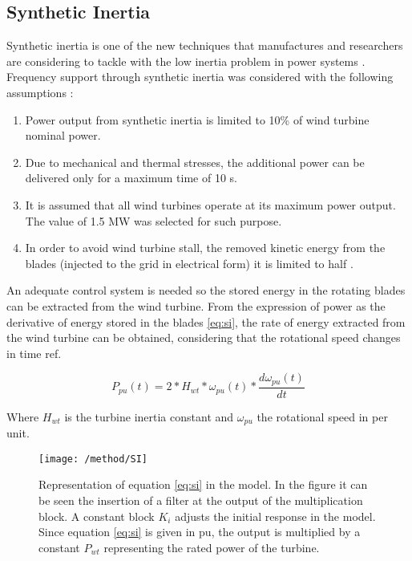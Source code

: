 \subsection{Synthetic Inertia}


Synthetic inertia is one of the new techniques that manufactures and researchers are considering to tackle with the low inertia problem in power systems \cite{Gevorgian.2017}\cite{GeneralElectricInternational.2013}. Frequency support through synthetic inertia was considered with the following assumptions \cite{dreidy2017inertia}\cite{nesje2015need}:
\begin{enumerate}[leftmargin=*,labelsep=4.9mm]
	\item Power output from synthetic inertia is limited to 10\% of wind turbine nominal power.
	\item Due to mechanical and thermal stresses, the additional power can be delivered only for a maximum time of 10 s.
	\item It is assumed that all wind turbines operate at its maximum power output. The value of 1.5 MW was selected for such purpose.
	\item In order to avoid wind turbine stall, the removed kinetic energy from the blades (injected to the grid in electrical form) it is limited to half \cite{E.MuljadiV.GevorgianandM.Singh:NREL.2012}.

\end{enumerate}

	An adequate control system is needed so the stored energy in the rotating blades can be extracted from the wind turbine. From the expression of power as the derivative of energy stored in the blades \eqref{eq:si}, the rate of energy extracted from the wind turbine can be obtained, considering that the rotational speed changes in time ref.

\begin{equation}
	\label{eq:si}
	P_{pu}(t)=2*H_{wt}*\omega_{pu}(t)*\dfrac{d\omega_{pu}(t)}{dt}
\end{equation}


Where  $H_{wt}$ is the turbine inertia constant and $\omega_{pu}$ the rotational speed in per unit.\\

\begin{figure}[h]
	\centering
	\texttt{[image: /method/SI]}
	\caption{Representation of equation \eqref{eq:si} in the model. In the figure it can be seen the insertion of a filter at the output of the multiplication block. A constant block $ K_i $ adjusts the initial response in the model. Since equation \eqref{eq:si} is given in pu, the output is multiplied by a constant $ P_{wt} $ representing the rated power of the turbine.}
	\label{fig:synthetic}
\end{figure}





